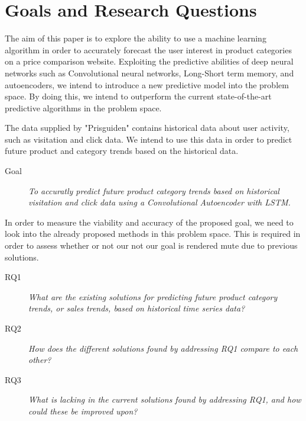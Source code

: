 \section{Goals and Research Questions}
\label{section:Introduction:Goal}

The aim of this paper is to explore the ability to use a machine learning algorithm in order to accurately forecast the user interest in product categories on a price comparison website.
Exploiting the predictive abilities of deep neural networks such as Convolutional neural networks, Long-Short term memory, and autoencoders,
we intend to introduce a new predictive model into the problem space.
By doing this, we intend to outperform the current state-of-the-art predictive algorithms in the problem space.

The data supplied by "Prisguiden" contains historical data about user activity, such as visitation and click data.
We intend to use this data in order to predict future product and category trends based on the historical data.

\begin{description}
    \item[Goal]{\it To accuratly predict future product category trends based on historical visitation and click data using a Convolutional Autoencoder with LSTM.}
\end{description}

In order to measure the viability and accuracy of the proposed goal, we need to look into the already proposed methods in this problem space.
This is required in order to assess whether or not our not our goal is rendered mute due to previous solutions.


\begin{description}
    \item[RQ1]{\it What are the existing solutions for predicting future product category trends, or sales trends, based on historical time series data?}
\end{description}

\begin{description}
    \item[RQ2]{\it How does the different solutions found by addressing RQ1 compare to each other?} 
\end{description}

\begin{description}
    \item[RQ3]{\it What is lacking in the current solutions found by addressing RQ1, and how could these be improved upon?}
\end{description}


